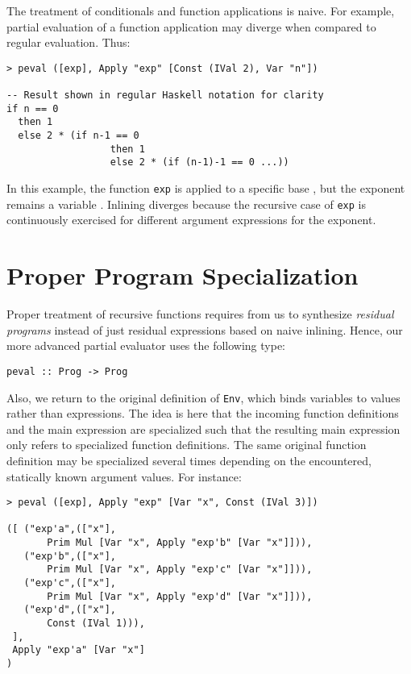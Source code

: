 \documentclass{eptcs}
\begin{document}
The treatment of conditionals and function applications is naive. For
example, partial evaluation of a function application may diverge when
compared to regular evaluation. Thus:

\begin{lstlisting}
> peval ([exp], Apply "exp" [Const (IVal 2), Var "n"])

-- Result shown in regular Haskell notation for clarity
if n == 0
  then 1
  else 2 * (if n-1 == 0
                  then 1 
                  else 2 * (if (n-1)-1 == 0 ...))
\end{lstlisting}

\noindent
In this example, the function \lstinline{exp} is applied to a specific
base , but the exponent remains a variable .  Inlining diverges
because the recursive case of \lstinline{exp} is continuously exercised
for different argument expressions for the exponent.


\section{Proper Program Specialization}

Proper treatment of recursive functions requires from us to
synthesize \emph{residual programs} instead of just residual
expressions based on naive inlining. Hence, our more advanced partial
evaluator uses the following type:

\begin{lstlisting}
peval :: Prog -> Prog
\end{lstlisting}

\noindent
Also, we return to the original definition of \lstinline{Env}, which
binds variables to values rather than expressions. The idea is here
that the incoming function definitions and the main expression are
specialized such that the resulting main expression only refers to
specialized function definitions. The same original function
definition may be specialized several times depending on the
encountered, statically known argument values. For instance:

\begin{lstlisting}
> peval ([exp], Apply "exp" [Var "x", Const (IVal 3)])

([ ("exp'a",(["x"],
       Prim Mul [Var "x", Apply "exp'b" [Var "x"]])),
   ("exp'b",(["x"],
       Prim Mul [Var "x", Apply "exp'c" [Var "x"]])),
   ("exp'c",(["x"],
       Prim Mul [Var "x", Apply "exp'd" [Var "x"]])),
   ("exp'd",(["x"],
       Const (IVal 1))), 
 ],
 Apply "exp'a" [Var "x"]
)
\end{lstlisting}
\end{document}

